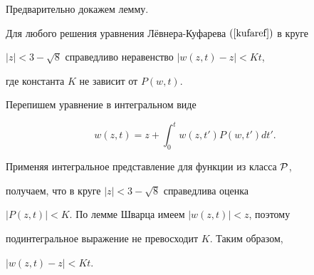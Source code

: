 Предварительно докажем лемму.





\begin{lem}\label{dist}


Для любого решения уравнения Л\"евнера-Куфарева $(\ref{kufaref})$ в круге


$|z|<3-\sqrt{8}$ справедливо неравенство $|w(z,t)-z|<K t$,


где константа $K$ не зависит от $P(w,t)$.


\end{lem}





\begin{pf}


Перепишем уравнение в интегральном виде


$$


w(z,t)=z+\int_{0}^{t}w(z,t')P(w,t')dt'.


$$


Применяя интегральное представление для функции из класса $\cal P$,


получаем, что в круге $|z|<3-\sqrt{8}$ справедлива оценка


$|P(z,t)|<K$. По лемме Шварца имеем $|w(z,t)|<z$, поэтому


подинтегральное выражение не превосходит $K$. Таким образом,


$|w(z,t)-z|<K t$.


\end{pf}





